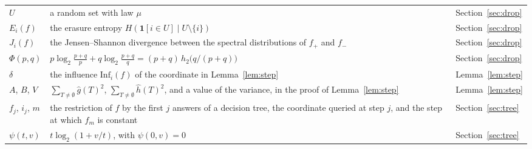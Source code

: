 \documentclass[11pt]{amsart}
\theoremstyle{remark}
\newcommand{\Inf}{\mathrm{Inf}}
\begin{document}
\begin{longtable}{@{}>{\raggedright\arraybackslash}p{}>{\raggedright\arraybackslash}p{}>{\raggedright\arraybackslash}p{}@{}}
$U$ & a random set with law $\mu$ & Section~\ref{sec:drop} \\
$E_i(f)$ & the erasure entropy $H(\mathbf 1[i\in U]\mid U\setminus\{i\})$ & Section~\ref{sec:drop} \\
$J_i(f)$ & the Jensen--Shannon divergence between the spectral distributions of $f_+$ and $f_-$ & Section~\ref{sec:drop} \\
$\Phi(p,q)$ & $p\log_2\frac{p+q}{p}+q\log_2\frac{p+q}{q}=(p+q)\,h_2\bigl(q/(p+q)\bigr)$ & Section~\ref{sec:drop} \\
$\delta$ & the influence $\Inf_i(f)$ of the coordinate in Lemma~\ref{lem:step} & Lemma~\ref{lem:step} \\
$A$, $B$, $V$ & $\sum_{T\ne\emptyset}\hat g(T)^2$, $\sum_{T\ne\emptyset}\hat h(T)^2$, and a value of the variance, in the proof of Lemma~\ref{lem:step} & Lemma~\ref{lem:step} \\
$f_j$, $i_j$, $m$ & the restriction of $f$ by the first $j$ answers of a decision tree, the coordinate queried at step $j$, and the step at which $f_m$ is constant & Section~\ref{sec:tree} \\
$\psi(t,v)$ & $t\log_2(1+v/t)$, with $\psi(0,v)=0$ & Section~\ref{sec:tree} \\
\bottomrule
\end{longtable}
\end{document}
